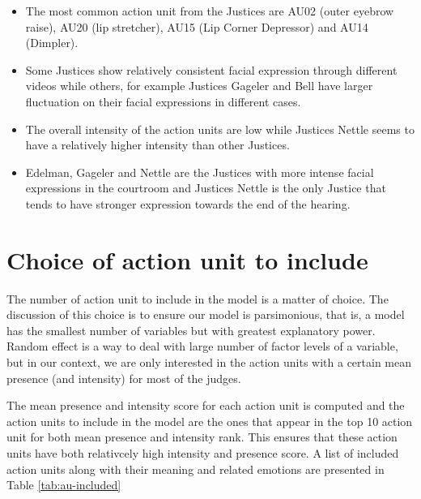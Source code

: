 \documentclass{monashthesis}
\begin{document}
\begin{itemize}
\item
  The most common action unit from the Justices are AU02 (outer eyebrow raise), AU20 (lip stretcher), AU15 (Lip Corner Depressor) and AU14 (Dimpler).
\item
  Some Justices show relatively consistent facial expression through different videos while others, for example Justices Gageler and Bell have larger fluctuation on their facial expressions in different cases.
\item
  The overall intensity of the action units are low while Justices Nettle seems to have a relatively higher intensity than other Justices.
\item
  Edelman, Gageler and Nettle are the Justices with more intense facial expressions in the courtroom and Justices Nettle is the only Justice that tends to have stronger expression towards the end of the hearing.
\end{itemize}

\newpage

\hypertarget{choice-of-action-unit-to-include}{%
\section{Choice of action unit to include}\label{choice-of-action-unit-to-include}}

The number of action unit to include in the model is a matter of choice. The discussion of this choice is to ensure our model is parsimonious, that is, a model has the smallest number of variables but with greatest explanatory power. Random effect is a way to deal with large number of factor levels of a variable, but in our context, we are only interested in the action units with a certain mean presence (and intensity) for most of the judges.

The mean presence and intensity score for each action unit is computed and the action units to include in the model are the ones that appear in the top 10 action unit for both mean presence and intensity rank. This ensures that these action units have both relativcely high intensity and presence score. A list of included action units along with their meaning and related emotions are presented in Table \ref{tab:au-included}
\end{document}
